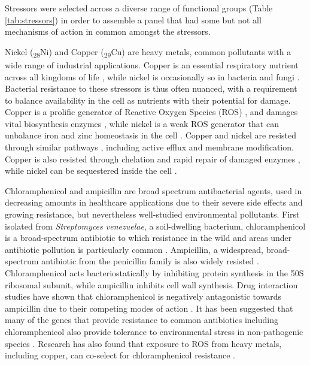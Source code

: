 \documentclass[final,1p,times]{elsarticle}
\begin{document}
Stressors were selected across a diverse range of functional groups (Table \ref{tab:stressors}) in order to assemble a panel that had some but not all mechanisms of action in common amongst the stressors.

Nickel (\textsubscript{28}Ni) and Copper (\textsubscript{29}Cu) are heavy metals, common pollutants with a wide range of industrial applications. Copper is an essential respiratory nutrient across all kingdoms of life \cite{Babcock1992OxygenRespiration}, while nickel is occasionally so in bacteria and fungi \cite{Zamble2015NickelBiology}. Bacterial resistance to these stressors is thus often nuanced, with a requirement to balance availability in the cell as nutrients with their potential for damage.  Copper is a prolific generator of Reactive Oxygen Species (ROS) \cite{Bal2002InductionMetals}, and damages vital biosynthesis enzymes \cite{Macomber2009TheToxicity}, while nickel is a weak ROS generator that can unbalance iron and zinc homeostasis in the cell \cite{Samland2006MicrobialDevelopments}. Copper and nickel are resisted through similar pathways \cite{Mykytczuk2011CytoplasmicFerrooxidans}, including active efflux and membrane modification. Copper is also resisted through chelation and rapid repair of damaged enzymes \cite{Macomber2009TheToxicity}, while nickel can be sequestered inside the cell \cite{Nishimura1998ProtonCerevisiae}.

Chloramphenicol and ampicillin are broad spectrum antibacterial agents, used in decreasing amounts in healthcare applications due to their severe side effects and growing resistance, but nevertheless well-studied environmental pollutants. First isolated from \textit{Streptomyces venezuelae}, a soil-dwelling bacterium, chloramphenicol is a broad-spectrum antibiotic to which resistance in the wild and areas under antibiotic pollution is particularly common \cite{Allen2010CallEnvironments}. Ampicillin, a widespread, broad-spectrum antibiotic from the penicillin family is also widely resisted \cite{Ruiz1999MechanismsFish}. Chloramphenicol acts bacteriostatically by inhibiting protein synthesis in the 50S ribosomal subunit, while ampicillin inhibits cell wall synthesis. Drug interaction studies have shown that chloramphenicol is negatively antagonistic towards ampicillin due to their competing modes of action \cite{vanBambeke2017MechanismsAction}. It has been suggested that many of the genes that provide resistance to common antibiotics including chloramphenicol also provide tolerance to environmental stress in non-pathogenic species \cite{Groh2007GenesResistance}. Research has also found that exposure to ROS from heavy metals, including copper, can co-select for chloramphenicol resistance \cite{Harrison2009ChromosomalTolerance}.
\end{document}
